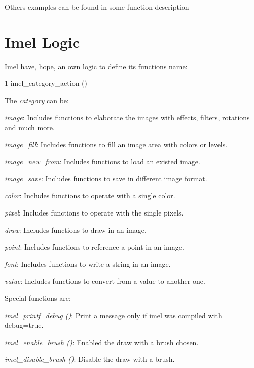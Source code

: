 Others examples can be found in some function description

\section*{Imel Logic}

Imel have, hope, an own logic to define its functions name\+: 
\begin{DoxyCode}
1 imel\_category\_action ()
\end{DoxyCode}


The {\itshape category} can be\+:
\begin{DoxyItemize}
\item {\itshape image}\+: Includes functions to elaborate the images with effects, filters, rotations and much more.
\item {\itshape image\+\_\+fill}\+: Includes functions to fill an image area with colors or levels.
\item {\itshape image\+\_\+new\+\_\+from}\+: Includes functions to load an existed image.
\item {\itshape image\+\_\+save}\+: Includes functions to save in different image format.
\item {\itshape color}\+: Includes functions to operate with a single color.
\item {\itshape pixel}\+: Includes functions to operate with the single pixels.
\item {\itshape draw}\+: Includes functions to draw in an image.
\item {\itshape point}\+: Includes functions to reference a point in an image.
\item {\itshape font}\+: Includes functions to write a string in an image.
\item {\itshape value}\+: Includes functions to convert from a value to another one.
\end{DoxyItemize}

Special functions are\+:
\begin{DoxyItemize}
\item {\itshape imel\+\_\+printf\+\_\+debug ()}\+: Print a message only if imel was compiled with debug=true.
\item {\itshape imel\+\_\+enable\+\_\+brush ()}\+: Enabled the draw with a brush chosen.
\item {\itshape imel\+\_\+disable\+\_\+brush ()}\+: Disable the draw with a brush.
\end{DoxyItemize}

